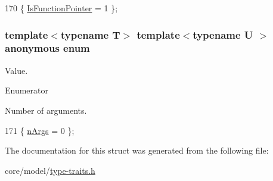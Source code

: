 \begin{DoxyCode}
170 \{ \hyperlink{structTypeTraits_1_1FunctionPtrTraits_3_01U_07_5_08_07void_08_4_a76d1f20c010aa03d3aaf029f7714b619ad0beb864e50ea35770e107c61f1ca453}{IsFunctionPointer} = 1    \};
\end{DoxyCode}
\subsubsection[{\texorpdfstring{anonymous enum}{anonymous enum}}]{\setlength{\rightskip}{0pt plus 5cm}template$<$typename T$>$ template$<$typename U $>$ anonymous enum}\hypertarget{structTypeTraits_1_1FunctionPtrTraits_3_01U_07_5_08_07void_08_4_a97d3e792758c691c34323daf59b721e8}{}\label{structTypeTraits_1_1FunctionPtrTraits_3_01U_07_5_08_07void_08_4_a97d3e792758c691c34323daf59b721e8}
Value. \begin{Desc}
\item[Enumerator]\par
\begin{description}
\item[{\em 
n\+Args\hypertarget{structTypeTraits_1_1FunctionPtrTraits_3_01U_07_5_08_07void_08_4_a97d3e792758c691c34323daf59b721e8ac3ac1bb6a7fd17677664a89b08224b12}{}\label{structTypeTraits_1_1FunctionPtrTraits_3_01U_07_5_08_07void_08_4_a97d3e792758c691c34323daf59b721e8ac3ac1bb6a7fd17677664a89b08224b12}
}]Number of arguments. \end{description}
\end{Desc}

\begin{DoxyCode}
171 \{ \hyperlink{structTypeTraits_1_1FunctionPtrTraits_3_01U_07_5_08_07void_08_4_a97d3e792758c691c34323daf59b721e8ac3ac1bb6a7fd17677664a89b08224b12}{nArgs} = 0                \};
\end{DoxyCode}


The documentation for this struct was generated from the following file\+:\begin{DoxyCompactItemize}
\item 
core/model/\hyperlink{type-traits_8h}{type-\/traits.\+h}\end{DoxyCompactItemize}
